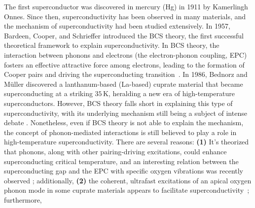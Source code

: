 \documentclass[11pt]{article}
\begin{document}
The first superconductor was discovered in mercury (Hg) in 1911 by Kamerlingh Onnes. Since then, superconductivity has been observed in many materials, and the mechanism of superconductivity had been studied extensively.
In 1957, Bardeen, Cooper, and Schrieffer introduced the BCS theory, the first successful theoretical framework to explain superconductivity\cite{bardeen_theory_1957}. 
In BCS theory, 
the interaction between phonons and electrons (the electron-phonon coupling, EPC) fosters an effective attractive force among electrons, leading to the formation of Cooper pairs and driving the superconducting transition~\cite{bardeen_theory_1957}. 
In 1986, Bednorz and Müller discovered a lanthanum-based (La-based) cuprate material that became superconducting at a striking $35\,\mathrm{K}$\cite{bednorz_possible_1986}, heralding a new era of high-temperature superconductors. 
However, BCS theory falls short in explaining this type of superconductivity, with its underlying mechanism still being a subject of intense debate \cite{keimer_quantum_2015}.
Nonetheless, even if BCS theory is not able to explain the mechanism, the concept of phonon-mediated interactions is still believed to play a role in high-temperature superconductivity. 
There are several reasons: \textbf{(1)} It's theorized that phonons, along with other pairing-driving excitations, could enhance superconducting critical temperature\cite{johnston_systematic_2010}, and an interesting relation between the superconducting gap and the EPC with specific oxygen vibrations was recently observed \cite{he_rapid_2018}; 
additionally, \textbf{(2)} the coherent, ultrafast excitations of an apical oxygen phonon mode in some cuprate materials appears to facilitate superconductivity~\cite{kaiser_optically_2014};
furthermore, 
\end{document}

